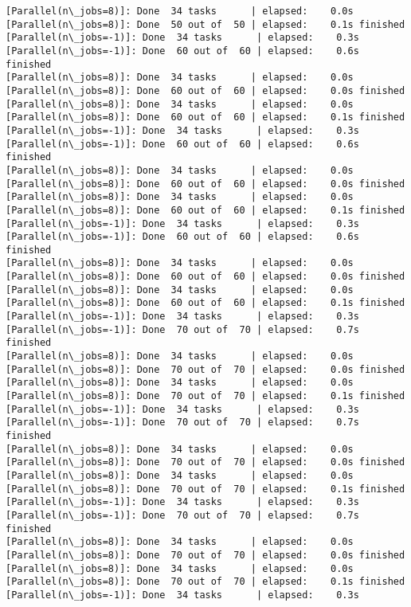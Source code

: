 \documentclass[11pt]{article}
\begin{document}
\begin{Verbatim}[commandchars=\\\{\}]
[Parallel(n\_jobs=8)]: Done  34 tasks      | elapsed:    0.0s
[Parallel(n\_jobs=8)]: Done  50 out of  50 | elapsed:    0.1s finished
[Parallel(n\_jobs=-1)]: Done  34 tasks      | elapsed:    0.3s
[Parallel(n\_jobs=-1)]: Done  60 out of  60 | elapsed:    0.6s finished
[Parallel(n\_jobs=8)]: Done  34 tasks      | elapsed:    0.0s
[Parallel(n\_jobs=8)]: Done  60 out of  60 | elapsed:    0.0s finished
[Parallel(n\_jobs=8)]: Done  34 tasks      | elapsed:    0.0s
[Parallel(n\_jobs=8)]: Done  60 out of  60 | elapsed:    0.1s finished
[Parallel(n\_jobs=-1)]: Done  34 tasks      | elapsed:    0.3s
[Parallel(n\_jobs=-1)]: Done  60 out of  60 | elapsed:    0.6s finished
[Parallel(n\_jobs=8)]: Done  34 tasks      | elapsed:    0.0s
[Parallel(n\_jobs=8)]: Done  60 out of  60 | elapsed:    0.0s finished
[Parallel(n\_jobs=8)]: Done  34 tasks      | elapsed:    0.0s
[Parallel(n\_jobs=8)]: Done  60 out of  60 | elapsed:    0.1s finished
[Parallel(n\_jobs=-1)]: Done  34 tasks      | elapsed:    0.3s
[Parallel(n\_jobs=-1)]: Done  60 out of  60 | elapsed:    0.6s finished
[Parallel(n\_jobs=8)]: Done  34 tasks      | elapsed:    0.0s
[Parallel(n\_jobs=8)]: Done  60 out of  60 | elapsed:    0.0s finished
[Parallel(n\_jobs=8)]: Done  34 tasks      | elapsed:    0.0s
[Parallel(n\_jobs=8)]: Done  60 out of  60 | elapsed:    0.1s finished
[Parallel(n\_jobs=-1)]: Done  34 tasks      | elapsed:    0.3s
[Parallel(n\_jobs=-1)]: Done  70 out of  70 | elapsed:    0.7s finished
[Parallel(n\_jobs=8)]: Done  34 tasks      | elapsed:    0.0s
[Parallel(n\_jobs=8)]: Done  70 out of  70 | elapsed:    0.0s finished
[Parallel(n\_jobs=8)]: Done  34 tasks      | elapsed:    0.0s
[Parallel(n\_jobs=8)]: Done  70 out of  70 | elapsed:    0.1s finished
[Parallel(n\_jobs=-1)]: Done  34 tasks      | elapsed:    0.3s
[Parallel(n\_jobs=-1)]: Done  70 out of  70 | elapsed:    0.7s finished
[Parallel(n\_jobs=8)]: Done  34 tasks      | elapsed:    0.0s
[Parallel(n\_jobs=8)]: Done  70 out of  70 | elapsed:    0.0s finished
[Parallel(n\_jobs=8)]: Done  34 tasks      | elapsed:    0.0s
[Parallel(n\_jobs=8)]: Done  70 out of  70 | elapsed:    0.1s finished
[Parallel(n\_jobs=-1)]: Done  34 tasks      | elapsed:    0.3s
[Parallel(n\_jobs=-1)]: Done  70 out of  70 | elapsed:    0.7s finished
[Parallel(n\_jobs=8)]: Done  34 tasks      | elapsed:    0.0s
[Parallel(n\_jobs=8)]: Done  70 out of  70 | elapsed:    0.0s finished
[Parallel(n\_jobs=8)]: Done  34 tasks      | elapsed:    0.0s
[Parallel(n\_jobs=8)]: Done  70 out of  70 | elapsed:    0.1s finished
[Parallel(n\_jobs=-1)]: Done  34 tasks      | elapsed:    0.3s

\end{Verbatim}
\end{document}
